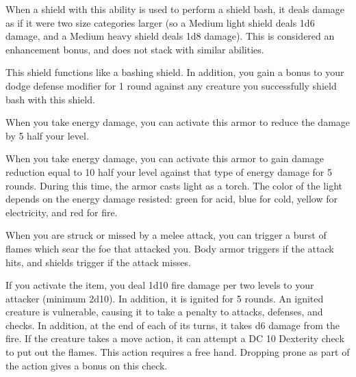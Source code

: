 
 When a shield with this ability is used to perform a shield bash, it deals damage as if it were two size categories larger (so a Medium light shield deals 1d6 damage, and a Medium heavy shield deals 1d8 damage). This is considered an enhancement bonus, and does not stack with similar abilities.


 This shield functions like a bashing shield. In addition, you gain a  bonus to your dodge defense modifier for 1 round against any creature you successfully shield bash with this shield.


 When you take energy damage, you can activate this armor to reduce the damage by 5 \add half your level.


 When you take energy damage, you can activate this armor to gain damage reduction equal to 10 \add half your level against that type of energy damage for 5 rounds. During this time, the armor casts light as a torch. The color of the light depends on the energy damage resisted: green for acid, blue for cold, yellow for electricity, and red for fire.


 When you are struck or missed by a melee attack, you can trigger a burst of flames which sear the foe that attacked you. Body armor triggers if the attack hits, and shields trigger if the attack misses.

If you activate the item, you deal 1d10 fire damage per two levels to your attacker (minimum 2d10). In addition, it is ignited for 5 rounds. An ignited creature is vulnerable, causing it to take a  penalty to attacks, defenses, and checks. In addition, at the end of each of its turns, it takes d6 damage from the fire. If the creature takes a move action, it can attempt a DC 10 Dexterity check to put out the flames. This action requires a free hand. Dropping prone as part of the action gives a  bonus on this check.

